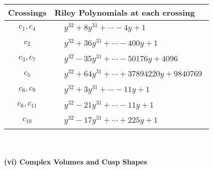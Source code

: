 \documentclass[1p]{elsarticle_modified}
\theoremstyle{definition}
\begin{document}
\begin{tabular}{m{50pt}|m{274pt}}
Crossings & \hspace{64pt}Riley Polynomials at each crossing \\
\hline $$\begin{aligned}c_{1},c_{4}\end{aligned}$$&$\begin{aligned}
&y^{32}+8 y^{31}+\cdots-4 y+1
\end{aligned}$\\
\hline $$\begin{aligned}c_{2}\end{aligned}$$&$\begin{aligned}
&y^{32}+36 y^{31}+\cdots-400 y+1
\end{aligned}$\\
\hline $$\begin{aligned}c_{3},c_{7}\end{aligned}$$&$\begin{aligned}
&y^{32}-35 y^{31}+\cdots-50176 y+4096
\end{aligned}$\\
\hline $$\begin{aligned}c_{5}\end{aligned}$$&$\begin{aligned}
&y^{32}+64 y^{31}+\cdots+37894220 y+9840769
\end{aligned}$\\
\hline $$\begin{aligned}c_{6},c_{9}\end{aligned}$$&$\begin{aligned}
&y^{32}+3 y^{31}+\cdots-11 y+1
\end{aligned}$\\
\hline $$\begin{aligned}c_{8},c_{11}\end{aligned}$$&$\begin{aligned}
&y^{32}-21 y^{31}+\cdots-11 y+1
\end{aligned}$\\
\hline $$\begin{aligned}c_{10}\end{aligned}$$&$\begin{aligned}
&y^{32}-17 y^{31}+\cdots+225 y+1
\end{aligned}$\\
\hline
\end{tabular}\\~\\
\newpage\flushleft \textbf{(vi) Complex Volumes and Cusp Shapes}
\end{document}
